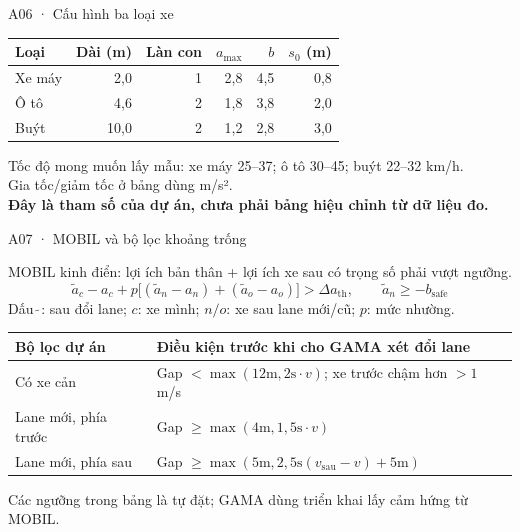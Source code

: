 \documentclass[aspectratio=169,10pt]{beamer}
\begin{document}
\begin{frame}{A06 · Cấu hình ba loại xe}
\relax

\begin{tabular}{@{}lrrrrr@{}}\toprule
Loại & Dài (m) & Làn con & $a_{\max}$ & $b$ & $s_0$ (m)\\\midrule
Xe máy & 2,0 & 1 & 2,8 & 4,5 & 0,8\\
Ô tô & 4,6 & 2 & 1,8 & 3,8 & 2,0\\
Buýt & 10,0 & 2 & 1,2 & 2,8 & 3,0\\\bottomrule\end{tabular}\par
\vspace{.4cm}
Tốc độ mong muốn lấy mẫu: xe máy 25–37; ô tô 30–45; buýt 22–32 km/h.\\[.2cm]
Gia tốc/giảm tốc ở bảng dùng m/s².\\[.3cm]
\textbf{Đây là tham số của dự án, chưa phải bảng hiệu chỉnh từ dữ liệu đo.}

\end{frame}
\begin{frame}{A07 · MOBIL và bộ lọc khoảng trống}
\relax

\small
MOBIL kinh điển: lợi ích bản thân + lợi ích xe sau có trọng số phải vượt ngưỡng.
\[\tilde a_c-a_c+p\big[(\tilde a_n-a_n)+(\tilde a_o-a_o)\big]>\Delta a_{\mathrm{th}},\qquad
\tilde a_n\ge-b_{\mathrm{safe}}\]
Dấu $\tilde{\ }$: sau đổi lane; $c$: xe mình; $n/o$: xe sau lane mới/cũ; $p$: mức nhường.
\vspace{.2cm}
\begin{tabular}{@{}lP{8.8cm}@{}}\toprule
Bộ lọc dự án & Điều kiện trước khi cho GAMA xét đổi lane\\\midrule
Có xe cản & Gap $<\max(12\mathrm{m},2\mathrm{s}\cdot v)$; xe trước chậm hơn $>1$ m/s\\
Lane mới, phía trước & Gap $\ge\max(4\mathrm{m},1,5\mathrm{s}\cdot v)$\\
Lane mới, phía sau & Gap $\ge\max(5\mathrm{m},2,5\mathrm{s}(v_{\mathrm{sau}}-v)+5\mathrm{m})$\\\bottomrule\end{tabular}\par
\vspace{.15cm}Các ngưỡng trong bảng là tự đặt; GAMA dùng triển khai lấy cảm hứng từ MOBIL.

\end{frame}
\end{document}

